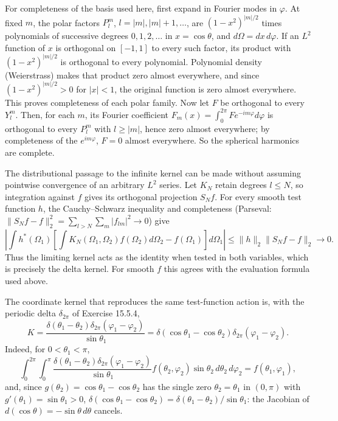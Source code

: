 For completeness of the basis used here, first expand in Fourier
modes in $\varphi$. At fixed $m$, the polar factors
$P_l^m$, $l=|m|,|m|+1,\ldots$, are
$(1-x^2)^{|m|/2}$ times polynomials of successive degrees
$0,1,2,\ldots$ in $x=\cos\theta$, and $d\Omega=dx\,d\varphi$.
If an $L^2$ function of $x$ is orthogonal on $[-1,1]$ to every such
factor, its product with $(1-x^2)^{|m|/2}$ is orthogonal to every
polynomial. Polynomial density (Weierstrass) makes that product zero
almost everywhere, and since $(1-x^2)^{|m|/2}>0$ for $|x|<1$, the
original function is zero almost everywhere.
This proves completeness of each polar family. Now let $F$ be
orthogonal to every $Y_l^m$. Then, for each $m$, its Fourier
coefficient $F_m(x)=\int_0^{2\pi}F e^{-im\varphi}d\varphi$ is
orthogonal to every $P_l^m$ with $l\ge|m|$, hence zero almost
everywhere; by completeness of the $e^{im\varphi}$, $F=0$ almost
everywhere. So the spherical harmonics are complete.

The distributional passage to the infinite kernel can be made
without assuming pointwise convergence of an arbitrary $L^2$ series.
Let $K_N$ retain degrees $l\le N$, so integration against $f$ gives
its orthogonal projection $S_Nf$. For every smooth test function $h$,
the Cauchy--Schwarz inequality and completeness (Parseval:
$\|S_Nf-f\|_2^2=\sum_{l>N}\sum_m|f_{lm}|^2\to0$) give
\[
\left|\int h^*(\Omega_1)
\left[\int K_N(\Omega_1,\Omega_2)f(\Omega_2)d\Omega_2
-f(\Omega_1)\right]d\Omega_1\right|
\le\|h\|_2\|S_Nf-f\|_2\longrightarrow0.
\]
Thus the limiting kernel acts as the identity when tested in both
variables, which is precisely the delta kernel. For smooth $f$ this
agrees with the evaluation formula used above.

The coordinate kernel that reproduces the same test-function action is,
with the periodic delta $\delta_{2\pi}$ of Exercise 15.5.4,
\[
\boxed{K=\frac{\delta(\theta_1-\theta_2)
\delta_{2\pi}(\varphi_1-\varphi_2)}{\sin\theta_1}
=\delta(\cos\theta_1-\cos\theta_2)
\delta_{2\pi}(\varphi_1-\varphi_2)}.
\]
Indeed, for $0<\theta_1<\pi$,
\[
\int_0^{2\pi}\!\!\int_0^\pi
\frac{\delta(\theta_1-\theta_2)\delta_{2\pi}(\varphi_1-\varphi_2)}
{\sin\theta_1}f(\theta_2,\varphi_2)\sin\theta_2\,d\theta_2\,d\varphi_2
=f(\theta_1,\varphi_1),
\]
and, since $g(\theta_2)=\cos\theta_1-\cos\theta_2$ has the single zero
$\theta_2=\theta_1$ in $(0,\pi)$ with $g'(\theta_1)=\sin\theta_1>0$,
$\delta(\cos\theta_1-\cos\theta_2)=\delta(\theta_1-\theta_2)/\sin\theta_1$:
the Jacobian of $d(\cos\theta)=-\sin\theta\,d\theta$ cancels.

